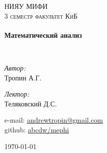 \begin{titlepage}
  \begin{center}


    \textsc{\LARGE НИЯУ МИФИ}\\[1.5cm]

    \textsc{\Large 3 семестр факультет КиБ}\\[0.5cm]

    \HRule \\[0.4cm]
    {\huge \bfseries Математический анализ\\[0.4cm]}

    \HRule \\[1.5cm]

    \begin{minipage}{0.4\textwidth}
      \begin{flushleft} \large
        \emph{Автор:}\\
        Тропин \textsc{А.Г.}
      \end{flushleft}
    \end{minipage}
    \begin{minipage}{0.4\textwidth}
      \begin{flushright} \large
        \emph{Лектор:} \\
        Теляковский \textsc{Д.С.}
      \end{flushright}
    \end{minipage}

    \vfill
    \begin{flushleft}
      e-mail: \href{mailto:andrewtropin@gmail.com}{andrewtropin@gmail.com} \\
      github: \href{http://github.com/abcdw/mephi}{abcdw/mephi}
    \end{flushleft}
    {\large \today}
  \end{center}
\end{titlepage}
